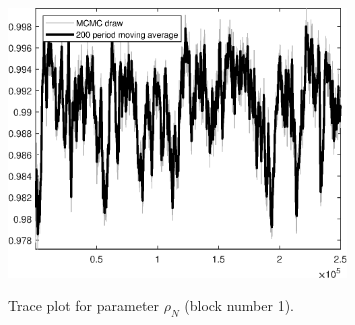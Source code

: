 \begin{figure}[H]
\centering
  \includegraphics[width=0.8\textwidth]{BRS_extended_fd/graphs/TracePlot_rho_N_blck_1}\\
    \caption{Trace plot for parameter ${\rho_N}$ (block number 1).}
\end{figure}
